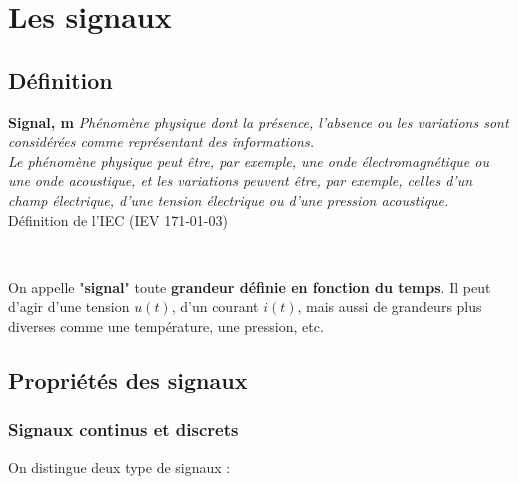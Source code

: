 \chapter{Les signaux}

\section{Définition}

\begin{minipage}{0.8\textwidth}
	\textbf{Signal, m} \textit{Phénomène physique dont la présence, l'absence ou les variations sont considérées comme représentant des informations.}\\

	\textit{Le phénomène physique peut être, par exemple, une onde électromagnétique ou une onde acoustique, et les variations peuvent être, par exemple, celles d’un champ électrique, d’une tension électrique ou d’une pression acoustique.} \\ 

	\hspace*{0pt}\hfill Définition de l'IEC (IEV 171-01-03)
\end{minipage} \\

\vspace{1cm}

On appelle "\textbf{signal}" toute \textbf{grandeur définie en fonction du temps}. Il peut d'agir d'une tension $u(t)$, d'un courant $i(t)$, mais aussi de grandeurs plus diverses comme une température, une pression, etc. 

\section{Propriétés des signaux}

\subsection{Signaux continus et discrets}

On distingue deux type de signaux : \\

